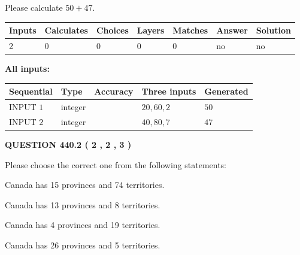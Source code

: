 \documentclass[12pt]{article}
\begin{document}
  
 
Please calculate $ %
50 +  %
47 $.
 
 
   
   
   
   
\noindent\begin{tabular}{|l|l|l|l|l|l|l|}
 \hline
Inputs & Calculates & Choices & Layers & Matches & Answer & Solution \\ \hline
 2  & 
 0  & 
 0
  & 
 0  & 
 0  & 
  no & 
  no 
  \\ \hline
 \end{tabular}
   
   
   
   
\noindent{}
   
   
   
   
\noindent\vspace{0.1in}\hspace{-0.08in} {\textbf{\Large{All inputs: }}}
   
   
  
  
\noindent\begin{tabular}{|l|l|l|l|l|}
\hline
 Sequential & Type & Accuracy & Three inputs & Generated \\ 
\hline
 
 
  INPUT $  1 $ & integer &  & $
 20
 , 
 60
 , 
 2
 $ & $ 50 $ 
 \\  \hline  
 
 
  INPUT $  2 $ & integer &  & $
 40
 , 
 80
 , 
 7
 $ & $ 47 $ 
 \\  \hline  
 \end{tabular}
   
   
  
\vspace{0.2in}
  
{\textbf{\Large{QUESTION
440.2 
 ( 2 , 2 , 3 )
}}}
  
  
Please choose the correct one from the following statements:
 
 
Canada has  15 provinces and  74 territories.
 
 
Canada has  13 provinces and  8 territories.
 
 
Canada has   4 provinces and  19 territories.
 
 
Canada has  26 provinces and  5 territories.
 
\end{document}
